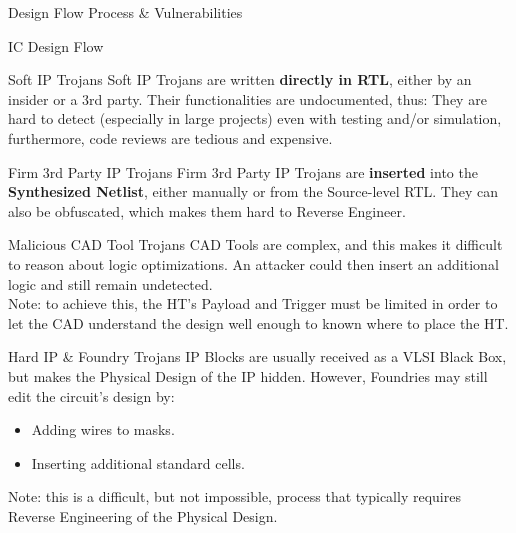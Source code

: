 \begin{section}{Design Flow Process \& Vulnerabilities}
\begin{subsection}{IC Design Flow}
     \begin{subsubsection}{Soft IP Trojans}
       Soft IP Trojans are written \textbf{directly in RTL}, either by an insider or a 3rd party.
       Their functionalities are undocumented, thus: They are hard to detect (especially in large
       projects) even with testing and/or simulation, furthermore, code reviews are tedious and
       expensive.
     \end{subsubsection}
     \begin{subsubsection}{Firm 3rd Party IP Trojans}
       Firm 3rd Party IP Trojans are \textbf{inserted} into the \textbf{Synthesized Netlist}, either
       manually or from the Source-level RTL. They can also be obfuscated, which makes them hard to
       Reverse Engineer.
     \end{subsubsection}
     \begin{subsubsection}{Malicious CAD Tool Trojans}
       CAD Tools are complex, and this makes it difficult to reason about logic optimizations.
       An attacker could then insert an additional logic and still remain undetected.\\
       Note: to achieve this, the HT’s Payload and Trigger must be limited in order to let the CAD
       understand the design well enough to known where to place the HT.
     \end{subsubsection}
     \begin{subsubsection}{Hard IP \& Foundry Trojans}
       IP Blocks are usually received as a VLSI Black Box, but makes the Physical Design of the IP
       hidden. However, Foundries may still edit the circuit’s design by:
       \begin{itemize}
         \item Adding wires to masks.
         \item Inserting additional standard cells.
       \end{itemize}
       Note: this is a difficult, but not impossible, process that typically requires Reverse
       Engineering of the Physical Design.
     \end{subsubsection}
  \end{subsection}
\end{section}

